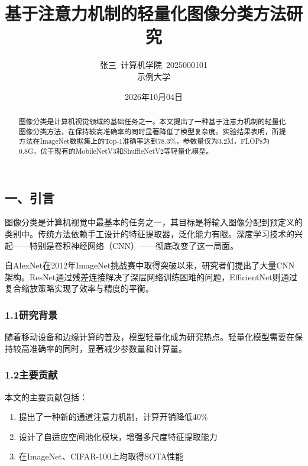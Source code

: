 \documentclass{harryopo-paper}
\title{基于注意力机制的轻量化图像分类方法研究}
\author{张三\ 计算机学院\ 2025000101\\ \fzfs\small 示例大学}
\date{2026年10月04日}
\begin{document}
\maketitle
\begin{abstract}
图像分类是计算机视觉领域的基础任务之一。本文提出了一种基于注意力机制的轻量化图像分类方法，在保持较高准确率的同时显著降低了模型复杂度。实验结果表明，所提方法在ImageNet数据集上的Top-1准确率达到78.3\%，参数量仅为3.2M，FLOPs为0.8G，优于现有的MobileNetV3和ShuffleNetV2等轻量化模型。
\end{abstract}

\subsection*{一、引言}

图像分类是计算机视觉中最基本的任务之一，其目标是将输入图像分配到预定义的类别中。传统方法依赖手工设计的特征提取器，泛化能力有限。深度学习技术的兴起——特别是卷积神经网络（CNN）——彻底改变了这一局面。

自AlexNet在2012年ImageNet挑战赛中取得突破以来，研究者们提出了大量CNN架构。ResNet通过残差连接解决了深层网络训练困难的问题，EfficientNet则通过复合缩放策略实现了效率与精度的平衡。

\subsubsection*{1.1研究背景}

随着移动设备和边缘计算的普及，模型轻量化成为研究热点。轻量化模型需要在保持较高准确率的同时，显著减少参数量和计算量。

\subsubsection*{1.2主要贡献}

本文的主要贡献包括：

\begin{enumerate}
  \item 提出了一种新的通道注意力机制，{\fzht 计算开销降低40\%}
  \item 设计了自适应空间池化模块，增强多尺度特征提取能力
  \item 在ImageNet、CIFAR-100上均取得SOTA性能
\end{enumerate}
\end{document}

